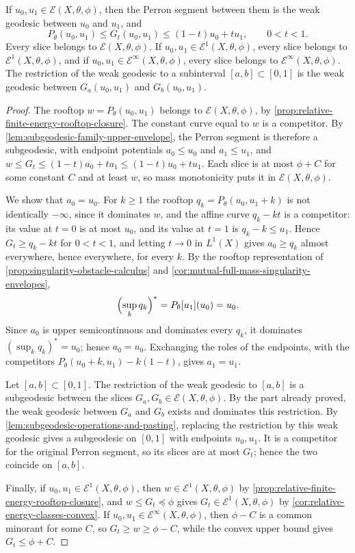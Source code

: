 \begin{theorem}\label{thm:relative-full-mass-perron-geodesic}
If $u_0,u_1\in\mathcal E(X,\theta,\phi)$, then the Perron segment between them is the weak geodesic between $u_0$ and $u_1$, and
\[
 P_\theta(u_0,u_1)\leq G_t(u_0,u_1)
                         \leq(1-t)u_0+tu_1,\qquad 0<t<1.
\]
Every slice belongs to $\mathcal E(X,\theta,\phi)$. If $u_0,u_1\in\mathcal E^1(X,\theta,\phi)$, every slice belongs to $\mathcal E^1(X,\theta,\phi)$, and if $u_0,u_1\in\mathcal E^\infty(X,\theta,\phi)$, every slice belongs to $\mathcal E^\infty(X,\theta,\phi)$. The restriction of the weak geodesic to a subinterval $[a,b]\subset[0,1]$ is the weak geodesic between $G_a(u_0,u_1)$ and $G_b(u_0,u_1)$.
\end{theorem}
\begin{proof}
The rooftop $w=P_\theta(u_0,u_1)$ belongs to $\mathcal E(X,\theta,\phi)$, by \cref{prop:relative-finite-energy-rooftop-closure}. The constant curve equal to $w$ is a competitor. By \cref{lem:subgeodesic-family-upper-envelope}, the Perron segment is therefore a subgeodesic, with endpoint potentials $a_0\leq u_0$ and $a_1\leq u_1$, and $w\leq G_t\leq(1-t)a_0+ta_1\leq(1-t)u_0+tu_1$. Each slice is at most $\phi+C$ for some constant $C$ and at least $w$, so mass monotonicity puts it in $\mathcal E(X,\theta,\phi)$.

We show that $a_0=u_0$. For $k\geq1$ the rooftop $q_k=P_\theta(u_0,u_1+k)$ is not identically $-\infty$, since it dominates $w$, and the affine curve $q_k-kt$ is a competitor: its value at $t=0$ is at most $u_0$, and its value at $t=1$ is $q_k-k\leq u_1$. Hence $G_t\geq q_k-kt$ for $0<t<1$, and letting $t\to0$ in $L^1(X)$ gives $a_0\geq q_k$ almost everywhere, hence everywhere, for every $k$. By the rooftop representation of \cref{prop:singularity-obstacle-calculus} and \cref{cor:mutual-full-mass-singularity-envelopes},
\[
 \Bigl(\sup_kq_k\Bigr)^*=P_\theta[u_1](u_0)=u_0.
\]
Since $a_0$ is upper semicontinuous and dominates every $q_k$, it dominates $(\sup_kq_k)^*=u_0$; hence $a_0=u_0$. Exchanging the roles of the endpoints, with the competitors $P_\theta(u_0+k,u_1)-k(1-t)$, gives $a_1=u_1$.

Let $[a,b]\subset[0,1]$. The restriction of the weak geodesic to $[a,b]$ is a subgeodesic between the slices $G_a,G_b\in\mathcal E(X,\theta,\phi)$. By the part already proved, the weak geodesic between $G_a$ and $G_b$ exists and dominates this restriction. By \cref{lem:subgeodesic-operations-and-pasting}, replacing the restriction by this weak geodesic gives a subgeodesic on $[0,1]$ with endpoints $u_0,u_1$. It is a competitor for the original Perron segment, so its slices are at most $G_t$; hence the two coincide on $[a,b]$.

Finally, if $u_0,u_1\in\mathcal E^1(X,\theta,\phi)$, then $w\in\mathcal E^1(X,\theta,\phi)$ by \cref{prop:relative-finite-energy-rooftop-closure}, and $w\leq G_t\preceq\phi$ gives $G_t\in\mathcal E^1(X,\theta,\phi)$ by \cref{cor:relative-energy-classes-convex}. If $u_0,u_1\in\mathcal E^\infty(X,\theta,\phi)$, then $\phi-C$ is a common minorant for some $C$, so $G_t\geq w\geq\phi-C$, while the convex upper bound gives $G_t\leq\phi+C$.
\end{proof}

